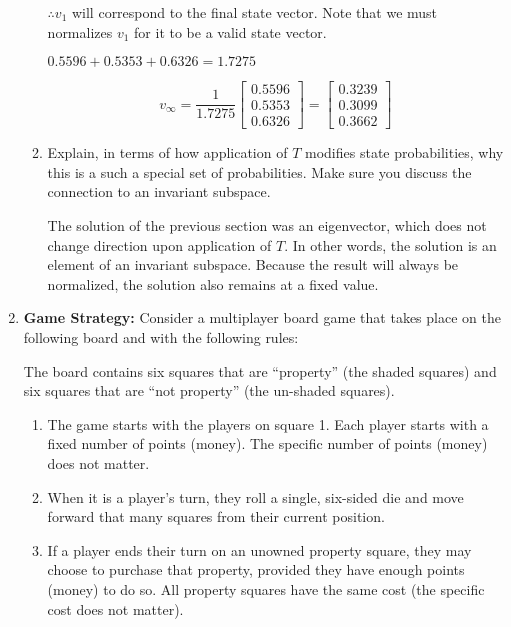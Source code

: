 \documentclass[fleqn]{article}
\begin{document}
\begin{enumerate}[nolistsep]
\begin{enumerate}
			$\therefore v_1$ will correspond to the final state vector. Note that we must normalizes $v_1$ for it to be a valid state vector.
			
			$0.5596 + 0.5353 + 0.6326 = 1.7275$
			
			\begin{equation*}
				v_{\infty} = \frac{1}{1.7275}\begin{bmatrix}
					0.5596 \\
					0.5353 \\
					0.6326
				\end{bmatrix} = \pmb{\begin{bmatrix}
					0.3239 \\
					0.3099 \\
					0.3662
				\end{bmatrix}}
			\end{equation*}
			
			\item Explain, in terms of how application of $T$ modifies state probabilities, why this is a such a special set of probabilities. Make sure you discuss the connection to an invariant subspace.
			
			The solution of the previous section was an eigenvector, which does not change direction upon application of $T$. In other words, the solution is an element of an invariant subspace. Because the result will always be normalized, the solution also remains at a fixed value.
		\end{enumerate}
		
		\item \textbf{Game Strategy:} Consider a multiplayer board game that takes place on the following board and with the following rules:
		
		The board contains six squares that are “property” (the shaded squares) and six squares that are “not property” (the un-shaded squares).
		
		\begin{enumerate}
			\item The game starts with the players on square 1. Each player starts with a fixed number of points (money). The specific number of points (money) does not matter.
			
			\item When it is a player’s turn, they roll a single, six-sided die and move forward that many squares from their current position.

			\item If a player ends their turn on an unowned property square, they may choose to purchase that property, provided they have enough points (money) to do so. All property squares have the same cost (the specific cost does not matter).


\end{enumerate}
\end{enumerate}
\end{document}
